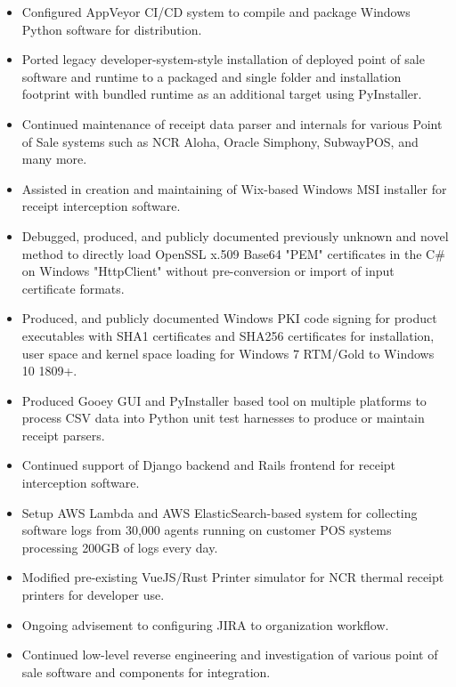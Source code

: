 \documentclass[10pt,letter,ragged2e]{altacv}
\begin{document}
\begin{paracol}{2}
\begin{itemize}
\item Configured AppVeyor CI/CD system to compile and package Windows Python software for distribution.
\item Ported legacy developer-system-style installation of deployed point of sale software and runtime to a packaged and single folder and installation footprint with bundled runtime as an additional target using PyInstaller.
\item Continued maintenance of receipt data parser and internals for various Point of Sale systems such as NCR Aloha, Oracle Simphony, SubwayPOS, and many more.
\item Assisted in creation and maintaining of Wix-based Windows MSI installer for receipt interception software.
\item Debugged, produced, and publicly documented previously unknown and novel method to directly load OpenSSL x.509 Base64 "PEM" certificates in the C\# on Windows "HttpClient" without pre-conversion or import of input certificate formats.
\item Produced, and publicly documented Windows PKI code signing for product executables with SHA1 certificates and SHA256 certificates for installation, user space and kernel space loading for Windows 7 RTM/Gold to Windows 10 1809+.
\item Produced Gooey GUI and PyInstaller based tool on multiple platforms to process CSV data into Python unit test harnesses to produce or maintain receipt parsers.
\item Continued support of Django backend and Rails frontend for receipt interception software.
\item Setup AWS Lambda and AWS ElasticSearch-based system for collecting software logs from 30,000 agents running on customer POS systems processing 200GB of logs every day.
\item Modified pre-existing VueJS/Rust Printer simulator for NCR thermal receipt printers for developer use.
\item Ongoing advisement to configuring JIRA to organization workflow.
\item Continued low-level reverse engineering and investigation of various point of sale software and components for integration.
\end{itemize}

\divider



\end{paracol}
\end{document}
